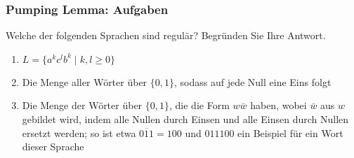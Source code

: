 \documentclass{beamer}
\begin{document}
\begin{frame}
\frametitle{Pumping Lemma: Aufgaben}
Welche der folgenden Sprachen sind regulär? Begründen Sie Ihre Antwort.

\begin{enumerate}
\item $L=\{a^kc^lb^k \mid k, l \geq 0 \}$
\item Die Menge aller Wörter über $\{0, 1\}$, sodass auf jede Null eine Eins folgt
\item Die Menge der Wörter über $\{0, 1\}$, die die Form $w\bar{w}$ haben, wobei $\bar{w}$ aus $w$ gebildet
wird, indem alle Nullen durch Einsen und alle Einsen durch Nullen ersetzt werden; so ist etwa 
$\overline{011}=100$ und $011100$ ein Beispiel für ein Wort dieser Sprache
\end{enumerate}

\end{frame}



\end{document}
